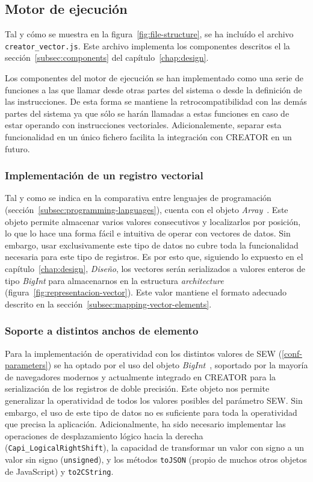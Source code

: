 \subsection{Motor de ejecución}{\label{implementation:motor}}
Tal y cómo se muestra en la figura~\ref{fig:file-structure}, se ha incluído el archivo \texttt{creator\_vector.js}. Este archivo implementa los componentes descritos el la sección~\ref{subsec:components} del capítulo~\ref{chap:design}\@.

Los componentes del motor de ejecución se han implementado como una serie de funciones a las que llamar desde otras partes del sistema o desde la definición de las instrucciones. De esta forma se mantiene la retrocompatibilidad con las demás partes del sistema ya que sólo se harán llamadas a estas funciones en caso de estar operando con instrucciones vectoriales. Adicionalemente, separar esta funcionalidad en un único fichero facilita la integración con CREATOR en un futuro.

\subsubsection{Implementación de un registro vectorial}

Tal y como se indica en la comparativa entre lenguajes de programación (sección~\ref{subsec:programming-languages}), {\js} cuenta con el objeto \textit{Array}~\cite{js-array}. Este objeto permite almacenar varios valores consecutivos y localizarlos por posición, lo que lo hace una forma fácil e intuitiva de operar con vectores de datos. Sin embargo, usar exclusivamente este tipo de datos no cubre toda la funcionalidad necesaria para este tipo de registros. Es por esto que, siguiendo lo expuesto en el capítulo~\ref{chap:design}, \textit{Diseño}, los vectores serán serializados a valores enteros de tipo \textit{BigInt} para almacenarnos en la estructura \textit{architecture} (figura~\ref{fig:representacion-vector}). Este valor mantiene el formato adecuado descrito en la sección~\ref{subsec:mapping-vector-elements}\@.

\subsubsection{Soporte a distintos anchos de elemento}

Para la implementación de operatividad con los distintos valores de SEW (\ref{conf-parameters}) se ha optado por el uso del objeto \textit{BigInt}~\cite{bigint}, soportado por la mayoría de navegadores modernos y actualmente integrado en CREATOR para la serialización de los registros de doble precisión. Este objeto nos permite generalizar la operatividad de todos los valores posibles del parámetro SEW\@. Sin embargo, el uso de este tipo de datos no es suficiente para toda la operatividad que precisa la aplicación. Adicionalmente, ha sido necesario implementar las operaciones de desplazamiento lógico hacia la derecha (\texttt{Capi\_LogicalRightShift}), la capacidad de transformar un valor con signo a un valor sin signo (\texttt{unsigned}), y los métodos \texttt{toJSON} (propio de muchos otros objetos de JavaScript) y \texttt{to2CString}. 

